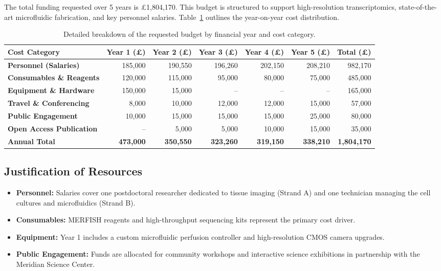 \documentclass[10pt,a4paper]{article}
\begin{document}
The total funding requested over 5 years is \pounds 1,804,170. This budget is structured to support high-resolution transcriptomics, state-of-the-art microfluidic fabrication, and key personnel salaries. Table~\ref{tab:budget} outlines the year-on-year cost distribution.

\begin{table}[htbp]
\centering
\sffamily\small
\renewcommand{\arraystretch}{1.2}
\begin{tabularx}{\textwidth}{X r r r r r r}
\toprule
\rowcolor{secondarycolor}
\textbf{\color{white}Cost Category} & 
\textbf{\color{white}Year 1 (\pounds)} & 
\textbf{\color{white}Year 2 (\pounds)} & 
\textbf{\color{white}Year 3 (\pounds)} & 
\textbf{\color{white}Year 4 (\pounds)} & 
\textbf{\color{white}Year 5 (\pounds)} & 
\textbf{\color{white}Total (\pounds)} \\
\midrule
\textbf{Personnel (Salaries)} & 185,000 & 190,550 & 196,260 & 202,150 & 208,210 & 982,170 \\
\rowcolor{bgcolor}
\textbf{Consumables \& Reagents} & 120,000 & 115,000 & 95,000 & 80,000 & 75,000 & 485,000 \\
\textbf{Equipment \& Hardware} & 150,000 & 15,000 & -- & -- & -- & 165,000 \\
\rowcolor{bgcolor}
\textbf{Travel \& Conferencing} & 8,000 & 10,000 & 12,000 & 12,000 & 15,000 & 57,000 \\
\textbf{Public Engagement} & 10,000 & 15,000 & 15,000 & 15,000 & 25,000 & 80,000 \\
\rowcolor{bgcolor}
\textbf{Open Access Publication} & -- & 5,000 & 5,000 & 10,000 & 15,000 & 35,000 \\
\midrule
\textbf{Annual Total} & \textbf{473,000} & \textbf{350,550} & \textbf{323,260} & \textbf{319,150} & \textbf{338,210} & \textbf{1,804,170} \\
\bottomrule
\end{tabularx}
\caption{Detailed breakdown of the requested budget by financial year and cost category.}
\label{tab:budget}
\end{table}

\subsection{Justification of Resources}
\begin{itemize}
    \item \textbf{Personnel:} Salaries cover one postdoctoral researcher dedicated to tissue imaging (Strand A) and one technician managing the cell cultures and microfluidics (Strand B).
    \item \textbf{Consumables:} MERFISH reagents and high-throughput sequencing kits represent the primary cost driver.
    \item \textbf{Equipment:} Year 1 includes a custom microfluidic perfusion controller and high-resolution CMOS camera upgrades.
    \item \textbf{Public Engagement:} Funds are allocated for community workshops and interactive science exhibitions in partnership with the Meridian Science Center.
\end{itemize}
\end{document}
